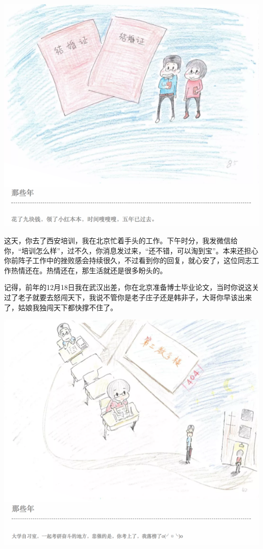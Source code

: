 \documentclass[]{book}
\begin{document}
\includegraphics[width=8.33in]{images/wife1}

这天，你去了西安培训，我在北京忙着手头的工作。下午时分，我发微信给你，``培训怎么样''，过不久，你消息发过来，``还不错，可以淘到宝''。本来还担心你前阵子工作中的挫败感会持续很久，不过看到你的回复，就心安了，这位同志工作热情还在。热情还在，那生活就还是很多盼头的。

记得，前年的12月18日我在武汉出差，你在北京准备博士毕业论文，当时你说这关过了老子就要去怒闯天下，我说不管你是老子庄子还是韩非子，大哥你早该出来了，姑娘我独闯天下都快撑不住了。

\includegraphics[width=8.33in]{images/wife2}
\end{document}

